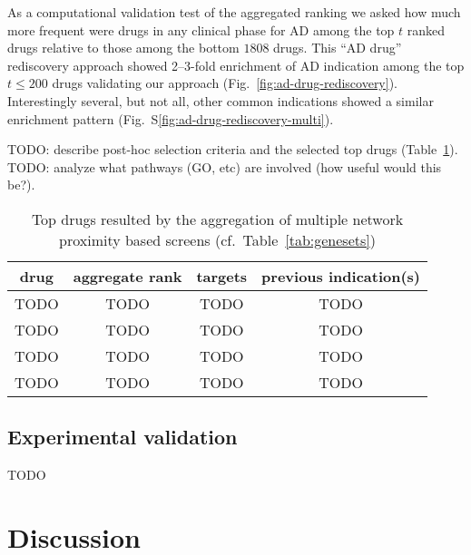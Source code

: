 \documentclass[letterpaper]{article}
\begin{document}
As a computational validation test of the aggregated ranking we asked how much
more frequent were drugs in any clinical phase for AD among the top $t$ ranked
drugs relative to those among the bottom $1808$ drugs.  This ``AD drug''
rediscovery approach showed 2--3-fold enrichment of AD indication among the
top $t \le 200$ drugs validating our approach
(Fig.~\ref{fig:ad-drug-rediscovery}).  Interestingly several, but not all,
other common indications showed a similar enrichment pattern
(Fig.~S\ref{fig:ad-drug-rediscovery-multi}).

TODO: describe post-hoc selection criteria and the selected top drugs
(Table~\ref{tab:top-drugs}).  TODO: analyze what pathways (GO, etc) are
involved (how useful would this be?).

\begin{table}
\footnotesize
\begin{tabular}{cccc}
drug     & aggregate rank & targets & previous indication(s)  \\
\hline
TODO & TODO & TODO & TODO \\
TODO & TODO & TODO & TODO \\
TODO & TODO & TODO & TODO \\
TODO & TODO & TODO & TODO \\
\end{tabular}
\caption{
Top drugs resulted by the aggregation of multiple network proximity based
screens (cf.~Table~\ref{tab:genesets})
}
\label{tab:top-drugs}
\end{table}

\subsection{Experimental validation}

TODO

\section{Discussion}
\end{document}
